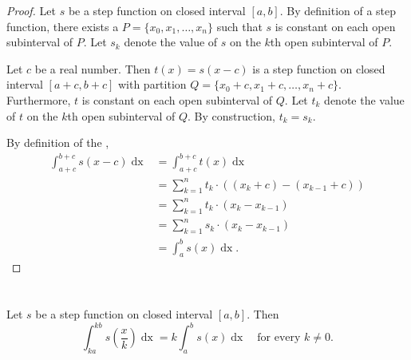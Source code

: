 \documentclass{report}
\begin{document}
\begin{proof}

  Let $s$ be a step function on closed interval $[a, b]$.
  By definition of a step function, there exists a 
    $P = \{x_0, x_1, \ldots, x_n\}$ such that $s$ is constant on each open
    subinterval of $P$.
  Let $s_k$ denote the value of $s$ on the $k$th open subinterval of $P$.

  Let $c$ be a real number.
  Then $t(x) = s(x - c)$ is a step function on closed interval $[a + c, b + c]$
    with partition $Q = \{x_0 + c, x_1 + c, \ldots, x_n + c\}$.
  Furthermore, $t$ is constant on each open subinterval of $Q$.
  Let $t_k$ denote the value of $t$ on the $k$th open subinterval of $Q$.
  By construction, $t_k = s_k$.

  By definition of the ,
    \begin{align*}
      \int_{a+c}^{b+c} s(x - c) \mathop{dx}
        & = \int_{a+c}^{b+c} t(x) \mathop{dx} \\
        & = \sum_{k=1}^n t_k \cdot ((x_k + c) - (x_{k - 1} + c)) \\
        & = \sum_{k=1}^n t_k \cdot (x_k - x_{k - 1}) \\
        & = \sum_{k=1}^n s_k \cdot (x_k - x_{k - 1}) \\
        & = \int_a^b s(x) \mathop{dx}.
    \end{align*}

\end{proof}

\section{}%
\label{sec:step-expansion-contraction-interval-integration}

Let $s$ be a step function on closed interval $[a, b]$.
Then
  $$\int_{ka}^{kb} s \left( \frac{x}{k} \right) \mathop{dx} =
    k \int_a^b s(x) \mathop{dx} \quad\text{for every } k \neq 0.$$
\end{document}
